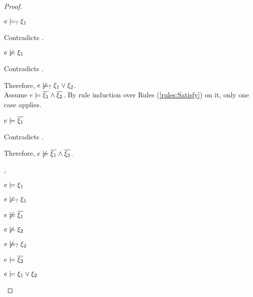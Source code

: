 \begin{proof}
\begin{byCases}
\begin{byCases}
\begin{byCases}
            \begin{pfsteps*}
            \item $e \models_{?} \xi_1$ 
            \end{pfsteps*}
            Contradicts .
        \item[\text{(\ref{rule:CMSOr2})}]
            \begin{pfsteps*}
            \item $e \not\models \xi_1$ 
            \end{pfsteps*}
            Contradicts .
        \end{byCases}
        Therefore, $e \not\models_{?} \xi_1 \vee \xi_2$. \\
        Assume $e \models \overline{\xi_1} \wedge \overline{\xi_2}$. By rule induction over Rules (\ref{rules:Satisfy}) on it, only one case applies.
        \begin{byCases}
        \item[\text{(\ref{rule:CSAnd})}]
            \begin{pfsteps*}
            \item $e \models \overline{\xi_1}$ 
            \end{pfsteps*}
            Contradicts .
        \end{byCases}
        Therefore, $e \not\models \overline{\xi_1} \wedge \overline{\xi_2}$.
    \item[\csatisfy{e}{\xi_1},\csatisfy{e}{\cdual{\xi_2}}]
        \begin{pfsteps*}
        \item $e \models \xi_1$  
        \item $e \not\models_{?} \xi_1$  
        \item $e \not\models \overline{\xi_1}$  
        \item $e \not\models \xi_2$  
        \item $e \not\models_{?} \xi_2$  
        \item $e \models \overline{\xi_2}$  
        \item $e \models \xi_1 \vee \xi_2$  

\end{pfsteps*}
\end{byCases}
\end{byCases}
\end{proof}
